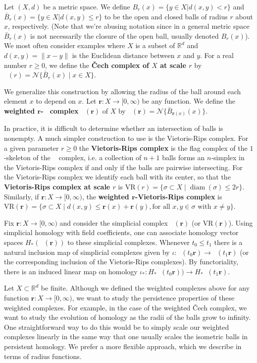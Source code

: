 \documentclass{amsart}
\newtheorem*{fibering lemma}{Fibering Lemma}
\newtheorem*{decomposition lemma}{Decomposition Lemma}
\newtheorem*{hurewicz theorem}{Hurewicz Theorem}
\theoremstyle{definition}
\newcommand{\df}[1]{{{\bf #1}}}
\newcommand{\Ball}{\bar{B}}
\newcommand{\VR}{\mathrm{VR}}
\DeclareMathOperator{\diam}{diam}
\DeclareMathOperator{\Cech}{\check{C}ech}
\begin{document}
Let $(X,d)$ be a metric space.  We define $B_r(x) = \{y \in X | d(x,y) <r\}$ and 
$\Ball_r(x)=  \{y \in X | d(x,y) \leq r\}$ to be the open and closed balls of radius $r$ about $x$, respectively. (Note that we're abusing notation since in a general metric space $\Ball_r(x)$ is not necessarily the closure of the open ball, usually denoted $B_r(x)$).  We most often consider examples where $X$ is a subset of $\mathbb{R}^d$ and $d(x,y) = \|x-y\|$ is the Euclidean distance between $x$ and $y$. For a real number $r\ge 0$, we define the \df{\v{C}ech complex of $X$ at scale $r$} by $\Cech(r)=\mathcal{N}\{\Ball_r(x)\mid x\in X\}$.  

We generalize this construction by allowing the radius of the ball around each element $x$ to depend on $x$. Let $\mathbf{r}:X\to[0,\infty)$ be any function. We define the \df{weighted $\mathbf{r}$-$\Cech$ complex} $\Cech(\mathbf{r})$ of $X$ by $\Cech(\mathbf{r})=\mathcal{N}\{\Ball_{\mathbf{r}(x)}(x)\}.$ 

In practice, it is difficult to determine whether an intersection of balls is nonempty. A much simpler construction to use is the Vietoris-Rips complex. For a given parameter $r\ge 0$ the \df{Vietoris-Rips complex} is the flag complex of the $1$-skeleton of the $\Cech$ complex, i.e. a collection of $n+1$ balls forms an $n$-simplex in the Vietoris-Rips complex if and only if the balls are pairwise intersecting.  For the Vietoris-Rips complex we identify each ball with its center, so that the \df{Vietoris-Rips complex at scale $r$} is $\VR(r) =\{\sigma\subset X\mid \diam(\sigma) \leq 2r\}.$ Similarly, if $\mathbf{r}:X\to [0,\infty)$, the \df{weighted $\mathbf{r}$-Vietoris-Rips complex} is $\VR(\mathbf{r}) =\{\sigma\subset X\mid d(x,y) \leq \mathbf{r}(x)+\mathbf{r}(y), \text{for all $x, y \in \sigma$ with $x \neq y$}\}$. 

Fix $\mathbf{r}:X\to[0,\infty)$ and consider the simplicial complex $\Cech(\mathbf{r})$ (or $\VR(\mathbf{r})$). Using simplicial homology with field coefficients, one can associate homology vector spaces $H_*\left(\Cech(\mathbf{r})\right)$ to these simplicial complexes. Whenever $t_0 \le t_1$ there is a natural inclusion map of simplicial complexes given by $\iota:\Cech(t_0\mathbf{r})\to \Cech(t_1\mathbf{r})$ (or the corresponding inclusion of the Vietoris-Rips complexes). By functoriality, there is an induced linear map on homology $\iota_*:H_*\Cech(t_0\mathbf{r}))\to H_*\Cech(t_1\mathbf{r})$.


Let $X\subset\mathbb{R}^d$ be finite. Although we defined the weighted complexes above for any function $\mathbf{r}:X\to[0,\infty)$, we want to study the persistence properties of these weighted complexes. For example, in the case of the weighted \v{C}ech complex, we want to study the evolution of homology as the radii of the balls grow to infinity. One straightforward way to do this would be to simply scale our weighted complexes linearly in the same way that one usually scales the isometric balls in persistent homology. We prefer a more flexible approach, which we describe in terms of radius functions. 
\end{document}

